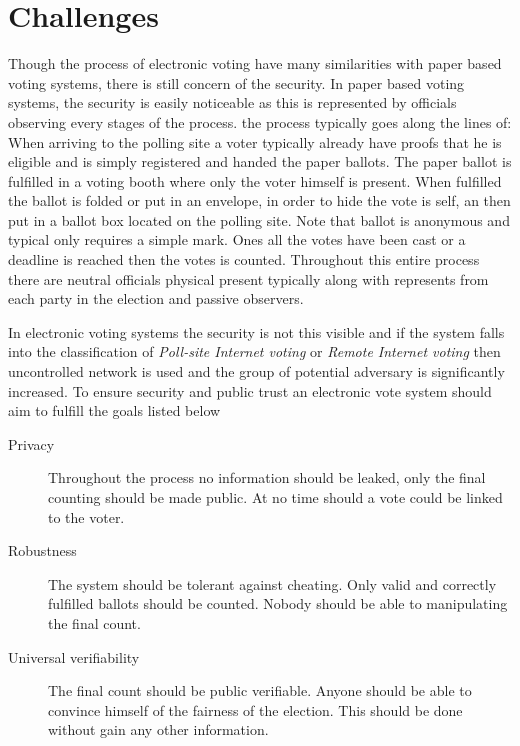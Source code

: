 \section{Challenges}
Though the process of electronic voting have many similarities with paper based voting systems, there is still concern of the security. In paper based voting systems, the security is easily noticeable as this is represented by officials observing every stages of the process. the process typically goes along the lines of: When arriving to the polling site a voter typically already have proofs that he is eligible and is simply registered and handed the paper ballots. The paper ballot is fulfilled in a voting booth where only the voter himself is present. When fulfilled the ballot is folded or put in an envelope, in order to hide the vote is self, an then put in a ballot box located on the polling site. Note that ballot is anonymous and typical only requires a simple mark. Ones all the votes have been cast or a deadline is reached then the votes is counted. Throughout this entire process there are neutral officials physical present typically along with represents from each party in the election and passive observers.  

\noindent
In electronic voting systems the security is not this visible and if the system falls into the classification of \textit{Poll-site Internet voting} or \textit{Remote Internet voting} then uncontrolled network is used and the group of potential adversary is significantly increased.
To ensure security and public trust an electronic vote system should aim to fulfill the goals 
listed below \cite{Damgaard2003}

\begin{description}
    \item[Privacy] Throughout the process no information should be leaked, only the final counting
    should be made public. At no time should a vote could be linked to the voter. 
    
    \item[Robustness] The system should be tolerant against cheating. Only valid and correctly fulfilled ballots should be counted. Nobody should be able to manipulating the final count.

    \item[Universal verifiability] The final count should be public verifiable. Anyone should be able to convince himself of the fairness of the election. This should be done without gain any other information.
        
\end{description}

